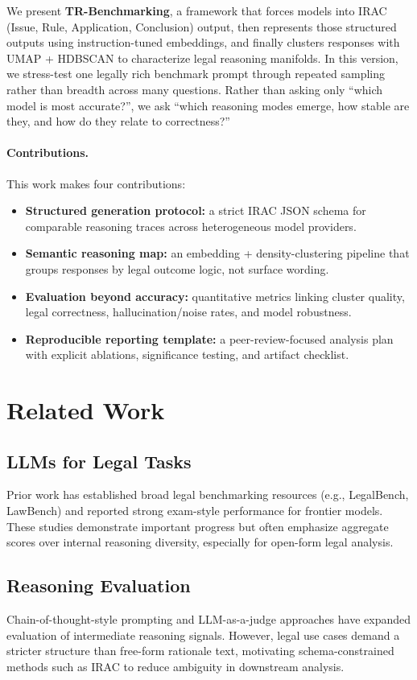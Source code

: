 \documentclass[11pt]{article}
\begin{document}
We present \textbf{TR-Benchmarking}, a framework that forces models into IRAC (Issue, Rule, Application, Conclusion) output, then represents those structured outputs using instruction-tuned embeddings, and finally clusters responses with UMAP + HDBSCAN to characterize legal reasoning manifolds. In this version, we stress-test one legally rich benchmark prompt through repeated sampling rather than breadth across many questions. Rather than asking only ``which model is most accurate?'', we ask ``which reasoning modes emerge, how stable are they, and how do they relate to correctness?''

\paragraph{Contributions.}
This work makes four contributions:
\begin{itemize}[leftmargin=1.5em]
    \item \textbf{Structured generation protocol:} a strict IRAC JSON schema for comparable reasoning traces across heterogeneous model providers.
    \item \textbf{Semantic reasoning map:} an embedding + density-clustering pipeline that groups responses by legal outcome logic, not surface wording.
    \item \textbf{Evaluation beyond accuracy:} quantitative metrics linking cluster quality, legal correctness, hallucination/noise rates, and model robustness.
    \item \textbf{Reproducible reporting template:} a peer-review-focused analysis plan with explicit ablations, significance testing, and artifact checklist.
\end{itemize}

\section{Related Work}
\subsection{LLMs for Legal Tasks}
Prior work has established broad legal benchmarking resources (e.g., LegalBench, LawBench) and reported strong exam-style performance for frontier models. These studies demonstrate important progress but often emphasize aggregate scores over internal reasoning diversity, especially for open-form legal analysis.

\subsection{Reasoning Evaluation}
Chain-of-thought-style prompting and LLM-as-a-judge approaches have expanded evaluation of intermediate reasoning signals. However, legal use cases demand a stricter structure than free-form rationale text, motivating schema-constrained methods such as IRAC to reduce ambiguity in downstream analysis.
\end{document}
